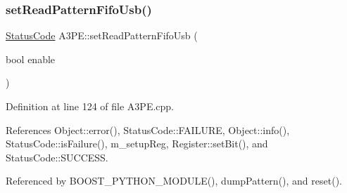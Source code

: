 \subsubsection{\texorpdfstring{set\+Read\+Pattern\+Fifo\+Usb()}{setReadPatternFifoUsb()}}
{\footnotesize\ttfamily \hyperlink{classStatusCode}{Status\+Code} A3\+P\+E\+::set\+Read\+Pattern\+Fifo\+Usb (\begin{DoxyParamCaption}\item[{bool}]{enable }\end{DoxyParamCaption})}



Definition at line 124 of file A3\+P\+E.\+cpp.



References Object\+::error(), Status\+Code\+::\+F\+A\+I\+L\+U\+RE, Object\+::info(), Status\+Code\+::is\+Failure(), m\+\_\+setup\+Reg, Register\+::set\+Bit(), and Status\+Code\+::\+S\+U\+C\+C\+E\+SS.



Referenced by B\+O\+O\+S\+T\+\_\+\+P\+Y\+T\+H\+O\+N\+\_\+\+M\+O\+D\+U\+L\+E(), dump\+Pattern(), and reset().


